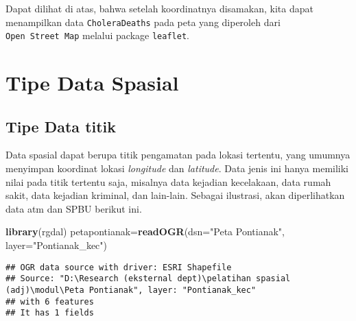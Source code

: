 \documentclass[
]{book}
\newenvironment{Shaded}{\begin{snugshade}}{\end{snugshade}}
\newcommand{\DataTypeTok}[1]{\textcolor[rgb]{0.13,0.29,0.53}{#1}}
\newcommand{\DecValTok}[1]{\textcolor[rgb]{0.00,0.00,0.81}{#1}}
\newcommand{\KeywordTok}[1]{\textcolor[rgb]{0.13,0.29,0.53}{\textbf{#1}}}
\newcommand{\NormalTok}[1]{#1}
\newcommand{\OperatorTok}[1]{\textcolor[rgb]{0.81,0.36,0.00}{\textbf{#1}}}
\newcommand{\StringTok}[1]{\textcolor[rgb]{0.31,0.60,0.02}{#1}}
\begin{document}
Dapat dilihat di atas, bahwa setelah koordinatnya disamakan, kita dapat menampilkan data \texttt{CholeraDeaths} pada peta yang diperoleh dari \texttt{Open\ Street\ Map} melalui package \texttt{leaflet}.

\hypertarget{tipe-data-spasial}{%
\section{Tipe Data Spasial}\label{tipe-data-spasial}}

\hypertarget{tipe-data-titik}{%
\subsection{Tipe Data titik}\label{tipe-data-titik}}

Data spasial dapat berupa titik pengamatan pada lokasi tertentu, yang umumnya menyimpan koordinat lokasi \emph{longitude} dan \emph{latitude}. Data jenis ini hanya memiliki nilai pada titik tertentu saja, misalnya data kejadian kecelakaan, data rumah sakit, data kejadian kriminal, dan lain-lain. Sebagai ilustrasi, akan diperlihatkan data atm dan SPBU berikut ini.

\begin{Shaded}
\begin{Highlighting}[]
\KeywordTok{library}\NormalTok{(rgdal)}
\NormalTok{petapontianak=}\KeywordTok{readOGR}\NormalTok{(}\DataTypeTok{dsn=}\StringTok{"Peta Pontianak"}\NormalTok{, }\DataTypeTok{layer=}\StringTok{"Pontianak\_kec"}\NormalTok{)}
\end{Highlighting}
\end{Shaded}

\begin{verbatim}
## OGR data source with driver: ESRI Shapefile 
## Source: "D:\Research (eksternal dept)\pelatihan spasial (adj)\modul\Peta Pontianak", layer: "Pontianak_kec"
## with 6 features
## It has 1 fields
\end{verbatim}

\begin{Shaded}
\end{Shaded}
\end{document}
